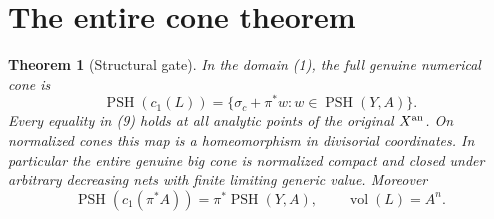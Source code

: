 \documentclass[11pt]{article}
\newcommand{\PSH}{\operatorname{PSH}}
\newcommand{\vol}{\operatorname{vol}}
\newtheorem{theorem}{Theorem}
\begin{document}
\section{The entire cone theorem}
\begin{theorem}[Structural gate]
In the domain (1), the full genuine numerical cone is
\[
 \PSH(c_1(L))
       =\{\sigma_c+\pi^*w:w\in\PSH(Y,A)\}.              \tag{9}
\]
Every equality in (9) holds at all analytic points of the original
$X^{\rm an}$. On normalized cones this map is a homeomorphism
in divisorial coordinates. In particular the entire genuine big
cone is normalized compact and closed under arbitrary decreasing
nets with finite limiting generic value. Moreover
\[
 \PSH(c_1(\pi^*A))=\pi^*\PSH(Y,A),\qquad
                     \vol(L)=A^n.                         \tag{10}
\]
\end{theorem}
\end{document}
